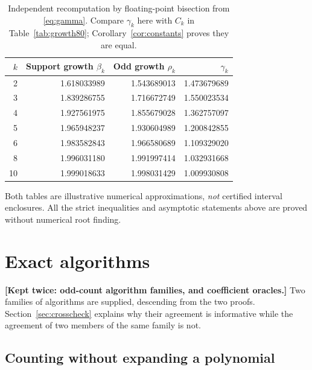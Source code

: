 \documentclass[11pt,letterpaper]{article}
\numberwithin{equation}{section}
\theoremstyle{definition}
\theoremstyle{remark}
\newcommand{\code}[1]{\texttt{\detokenize{#1}}}
\begin{document}
\begin{table}[htbp]
\centering

\caption{Primary numerical record: $80$-digit \code{Decimal} bisection,
truncated for display. Here $\rho_k$ is the odd-coefficient growth
constant, $C_k$ the leading constant of \eqref{eq:asymptotic}, and
$\beta_k$ the $k$-bonacci growth constant.}
\label{tab:growth80}
\end{table}

\begin{table}[htbp]
\centering
\begin{tabular}{rrrr}
\toprule
$k$ & Support growth $\beta_k$ & Odd growth $\rho_k$ & $\gamma_k$\\
\midrule
2&1.618033989&1.543689013&1.473679689\\
3&1.839286755&1.716672749&1.550023534\\
4&1.927561975&1.855679028&1.362757097\\
5&1.965948237&1.930604989&1.200842855\\
6&1.983582843&1.966580689&1.109329020\\
8&1.996031180&1.991997414&1.032931668\\
10&1.999018633&1.998031429&1.009930808\\
\bottomrule
\end{tabular}
\caption{Independent recomputation by floating-point bisection from
\eqref{eq:gamma}. Compare $\gamma_k$ here with $C_k$ in
Table~\ref{tab:growth80}; Corollary~\ref{cor:constants} proves they are
equal.}
\label{tab:growth}
\end{table}

Both tables are illustrative numerical approximations, \emph{not} certified
interval enclosures. All the strict inequalities and asymptotic statements
above are proved without numerical root finding.

\section{Exact algorithms}
\label{sec:algorithms}

\noindent\textbf{[Kept twice: odd-count algorithm families, and coefficient
oracles.]}
Two families of algorithms are supplied, descending from the two proofs.
Section~\ref{sec:crosscheck} explains why their agreement is informative
while the agreement of two members of the same family is not.

\subsection{Counting without expanding a polynomial}
\end{document}
